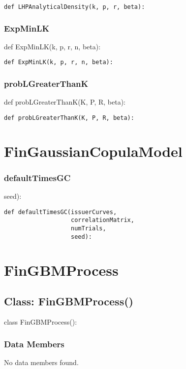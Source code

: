 \documentclass[twoside,11pt]{book}
\begin{document}
\begin{lstlisting}
def LHPAnalyticalDensity(k, p, r, beta):
\end{lstlisting}

\subsubsection*{{\bf ExpMinLK}}
def ExpMinLK(k, p, r, n, beta): 

\begin{lstlisting}
def ExpMinLK(k, p, r, n, beta):
\end{lstlisting}

\subsubsection*{{\bf probLGreaterThanK}}
def probLGreaterThanK(K, P, R, beta): 

\begin{lstlisting}
def probLGreaterThanK(K, P, R, beta):
\end{lstlisting}

\newpage
\section{FinGaussianCopulaModel}

\subsubsection*{{\bf defaultTimesGC}}
seed): 

\begin{lstlisting}
def defaultTimesGC(issuerCurves,
                   correlationMatrix,
                   numTrials,
                   seed):
\end{lstlisting}

\newpage
\section{FinGBMProcess}

\subsection*{Class: FinGBMProcess()}
class FinGBMProcess(): 

\subsubsection*{Data Members}
No data members found.
\end{document}

